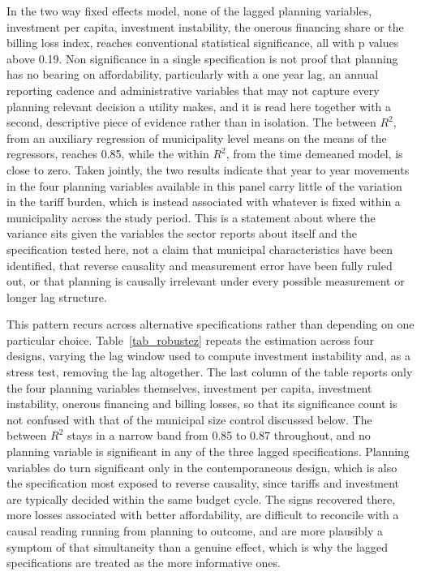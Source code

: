 \documentclass[pdflatex,sn-mathphys-num]{sn-jnl}%
\theoremstyle{thmstyleone}%
\theoremstyle{thmstyletwo}%
\theoremstyle{thmstylethree}%
\begin{document}
In the two way fixed effects model, none of the lagged planning variables, investment per capita, investment instability, the onerous financing share or the billing loss index, reaches conventional statistical significance, all with p values above 0.19. Non significance in a single specification is not proof that planning has no bearing on affordability, particularly with a one year lag, an annual reporting cadence and administrative variables that may not capture every planning relevant decision a utility makes, and it is read here together with a second, descriptive piece of evidence rather than in isolation. The between $R^2$, from an auxiliary regression of municipality level means on the means of the regressors, reaches 0.85, while the within $R^2$, from the time demeaned model, is close to zero. Taken jointly, the two results indicate that year to year movements in the four planning variables available in this panel carry little of the variation in the tariff burden, which is instead associated with whatever is fixed within a municipality across the study period. This is a statement about where the variance sits given the variables the sector reports about itself and the specification tested here, not a claim that municipal characteristics have been identified, that reverse causality and measurement error have been fully ruled out, or that planning is causally irrelevant under every possible measurement or longer lag structure.

This pattern recurs across alternative specifications rather than depending on one particular choice. Table~\ref{tab_robustez} repeats the estimation across four designs, varying the lag window used to compute investment instability and, as a stress test, removing the lag altogether. The last column of the table reports only the four planning variables themselves, investment per capita, investment instability, onerous financing and billing losses, so that its significance count is not confused with that of the municipal size control discussed below. The between $R^2$ stays in a narrow band from 0.85 to 0.87 throughout, and no planning variable is significant in any of the three lagged specifications. Planning variables do turn significant only in the contemporaneous design, which is also the specification most exposed to reverse causality, since tariffs and investment are typically decided within the same budget cycle. The signs recovered there, more losses associated with better affordability, are difficult to reconcile with a causal reading running from planning to outcome, and are more plausibly a symptom of that simultaneity than a genuine effect, which is why the lagged specifications are treated as the more informative ones.
\end{document}
